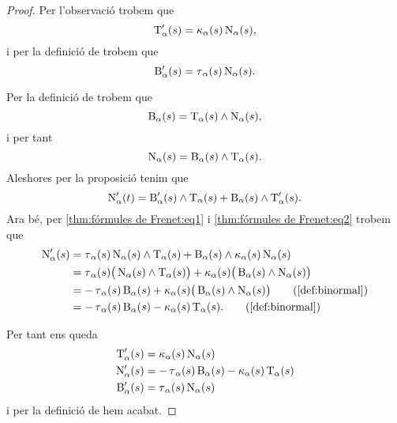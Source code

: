 \documentclass[../Apunts.tex]{subfiles}
\begin{document}
	\begin{proof}
		Per l'observació  trobem que
		\begin{equation}
			\label{thm:fórmules de Frenet:eq1}
			\operatorname{T}_{\alpha}'(s)=\operatorname{\kappa}_{\alpha}(s)\operatorname{N}_{\alpha}(s),
		\end{equation}
		i per la definició de  trobem que
		\begin{equation}
			\label{thm:fórmules de Frenet:eq2}
			\operatorname{B}'_{\alpha}(s)=\operatorname{\tau}_{\alpha}(s)\operatorname{N}_{\alpha}(s).
		\end{equation}
		
		Per la definició de  trobem que
		\[\operatorname{B}_{\alpha}(s)=\operatorname{T}_{\alpha}(s)\mathbin{\wedge}\operatorname{N}_{\alpha}(s),\]
		i per tant %
		\[\operatorname{N}_{\alpha}(s)=\operatorname{B}_{\alpha}(s)\mathbin{\wedge}\operatorname{T}_{\alpha}(s).\]
		Aleshores per la proposició  tenim que
		\[\operatorname{N}'_{\alpha}(t)=\operatorname{B}'_{\alpha}(s)\mathbin{\wedge}\operatorname{T}_{\alpha}(s)+\operatorname{B}_{\alpha}(s)\mathbin{\wedge}\operatorname{T}'_{\alpha}(s).\]
		Ara bé, per \eqref{thm:fórmules de Frenet:eq1} i \eqref{thm:fórmules de Frenet:eq2} trobem que
		\begin{align*}
			\normal'_{\alpha}(s)&=\torsio_{\alpha}(s)\normal_{\alpha}(s)\prodvec\tangent_{\alpha}(s)+\binormal_{\alpha}(s)\prodvec\curvatura_{\alpha}(s)\normal_{\alpha}(s) \\
			&=\torsio_{\alpha}(s)\big(\normal_{\alpha}(s)\prodvec\tangent_{\alpha}(s)\big)+\curvatura_{\alpha}(s)\big(\binormal_{\alpha}(s)\prodvec\normal_{\alpha}(s)\big) \\ %
			&=-\torsio_{\alpha}(s)\binormal_{\alpha}(s)+\curvatura_{\alpha}(s)\big(\binormal_{\alpha}(s)\prodvec\normal_{\alpha}(s)\big) \tag{\ref{def:binormal}} \\
			&=-\torsio_{\alpha}(s)\binormal_{\alpha}(s)-\curvatura_{\alpha}(s)\tangent_{\alpha}(s). \tag{\ref{def:binormal}}
		\end{align*}
		
		Per tant ens queda
		\begin{align*}
			\operatorname{T}_{\alpha}'(s)&=\operatorname{\kappa}_{\alpha}(s)\operatorname{N}_{\alpha}(s) \\
			\operatorname{N}'_{\alpha}(s)&=-\operatorname{\tau}_{\alpha}(s)\operatorname{B}_{\alpha}(s)-\operatorname{\kappa}_{\alpha}(s)\operatorname{T}_{\alpha}(s) \\
			\operatorname{B}'_{\alpha}(s)&=\operatorname{\tau}_{\alpha}(s)\operatorname{N}_{\alpha}(s)
		\end{align*}
		i per la definició de  hem acabat.
	\end{proof}
\end{document}
